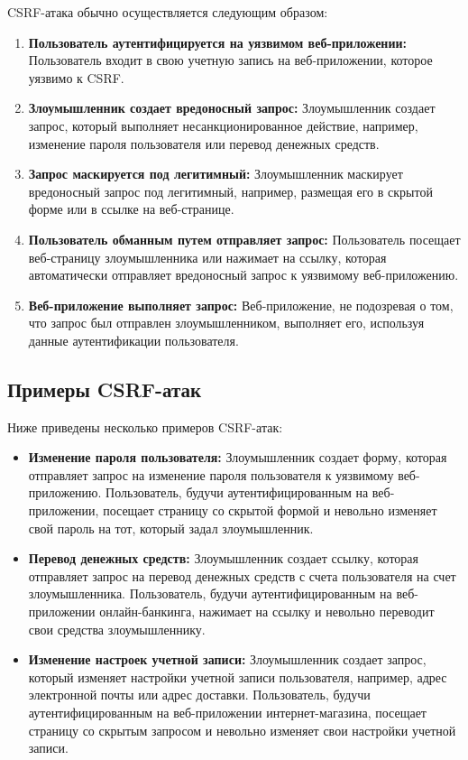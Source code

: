 \documentclass[a4paper,12pt]{diplom}
\begin{document}
	 CSRF-атака обычно осуществляется следующим образом:
	 
	 \begin{enumerate}[label=\arabic{enumi})]
	 	\item \textbf{Пользователь аутентифицируется на уязвимом веб-приложении:}  Пользователь входит в свою учетную запись на веб-приложении, которое уязвимо к CSRF.
		\item \textbf{Злоумышленник создает вредоносный запрос:}  Злоумышленник создает запрос, который выполняет несанкционированное действие, например, изменение пароля пользователя или перевод денежных средств.
	 	\item \textbf{Запрос маскируется под легитимный:}  Злоумышленник маскирует вредоносный запрос под легитимный, например, размещая его в скрытой форме или в ссылке на веб-странице.
	 	\item \textbf{Пользователь обманным путем отправляет запрос:}  Пользователь посещает веб-страницу злоумышленника или нажимает на ссылку, которая автоматически отправляет вредоносный запрос к уязвимому веб-приложению.
	 	\item \textbf{Веб-приложение выполняет запрос:}  Веб-приложение, не подозревая о том, что запрос был отправлен злоумышленником, выполняет его, используя данные аутентификации пользователя.
	\end{enumerate}
	 
	\subsection{Примеры CSRF-атак}
	 
	Ниже приведены несколько примеров CSRF-атак:
	 
	\begin{itemize}
		\item \textbf{Изменение пароля пользователя:}  Злоумышленник создает форму, которая отправляет запрос на изменение пароля пользователя к уязвимому веб-приложению. Пользователь, будучи аутентифицированным на веб-приложении, посещает страницу со скрытой формой и невольно изменяет свой пароль на тот, который задал злоумышленник.
		\item \textbf{Перевод денежных средств:}  Злоумышленник создает ссылку, которая отправляет запрос на перевод денежных средств с счета пользователя на счет злоумышленника. Пользователь, будучи аутентифицированным на веб-приложении онлайн-банкинга, нажимает на ссылку и невольно переводит свои средства злоумышленнику.
	 	\item \textbf{Изменение настроек учетной записи:}  Злоумышленник создает запрос, который изменяет настройки учетной записи пользователя, например, адрес электронной почты или адрес доставки. Пользователь, будучи аутентифицированным на веб-приложении интернет-магазина, посещает страницу со скрытым запросом и невольно изменяет свои настройки учетной записи.
	\end{itemize}
	 
\end{document}
